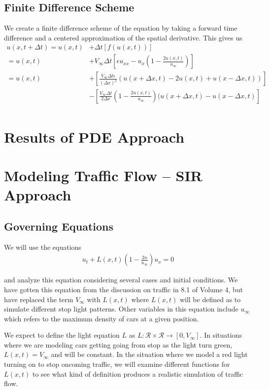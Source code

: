 \documentclass[12pt]{article}
\begin{document}
	\subsection{Finite Difference Scheme}
	We create a finite difference scheme of the equation by taking a forward time difference and a centered approximation of the spatial derivative. This gives us
	\begin{align*}
	u(x,t+\Delta t)=u(x,t)&+\Delta t[f(u(x,t))] \\
	=u(x,t)&+V_{\infty}\Delta t\left[\epsilon u_{xx}-u_x\left(1-\frac{2u(x,t)}{u_{\infty}}\right)\right] \\
	=u(x,t)&+\left[\frac{V_{\infty}\Delta t\epsilon}{(\Delta x)^2}(u(x+\Delta x, t)-2u(x,t)+u(x-\Delta x,t))\right] \\
	&-\left[\frac{V_{\infty}\Delta t}{2\Delta x}\left(1-\frac{2u(x,t)}{u_{\infty}}\right)(u(x+\Delta x,t)-u(x-\Delta x,t)\right] \\
	\end{align*}
	\section{Results of PDE Approach}
	
	\section{Modeling Traffic Flow – SIR Approach}
	
	\subsection{Governing Equations} 
	We will use the equations 
	\begin{align*}
	u_t + L(x, t) ( 1 - \frac{2n}{u_\infty} ) u_x = 0 
	\end{align*}
	
	and analyze this equation considering several cases and initial conditions. We have gotten this equation from the discussion on traffic in 8.1 of Volume 4, but have replaced the term $V_\infty$ with $L(x, t)$ where $L(x, t)$ will be defined as to simulate different stop light patterns. Other variables in this equation include $u_\infty$ which refers to the maximum density of cars at a given position. 
	
	We expect to define the light equation $L$ as $L : \mathcal{R} \times \mathcal{R} \to [0, V_\infty]$. In situations where we are modeling cars getting going from stop as the light turn green, $L(x, t) = V_\infty$ and will be constant. In the situation where we model a red light turning on to stop oncoming traffic, we will examine different functions for $L(x, t)$ to see what kind of definition produces a realistic simulation of traffic flow. 
	
\end{document}
